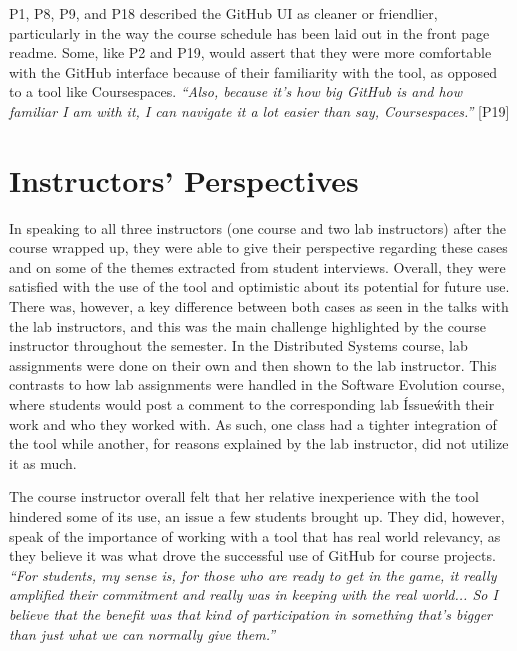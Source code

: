 P1, P8, P9, and P18 described the GitHub UI as cleaner or friendlier, particularly in the way the course schedule has been laid out in the front page readme. Some, like P2 and P19, would assert that they were more comfortable with the GitHub interface because of their familiarity with the tool, as opposed to a tool like Coursespaces. \textit{``Also, because it's how big GitHub is and how familiar I am with it, I can navigate it a lot easier than say, Coursespaces.''} [P19]


\section{Instructors' Perspectives}
In speaking to all three instructors (one course and two lab instructors) after the course wrapped up, they were able to give their perspective regarding these cases and on some of the themes extracted from student interviews. Overall, they were satisfied with the use of the tool and optimistic about its potential for future use. There was, however, a key difference between both cases as seen in the talks with the lab instructors, and this was the main challenge highlighted by the course instructor throughout the semester. In the Distributed Systems course, lab assignments were done on their own and then shown to the lab instructor. This contrasts to how lab assignments were handled in the Software Evolution course, where students would post a comment to the corresponding lab \'Issue\' with their work and who they worked with. As such, one class had a tighter integration of the tool while another, for reasons explained by the lab instructor, did not utilize it as much.

The course instructor overall felt that her relative inexperience with the tool hindered some of its use, an issue a few students brought up. They did, however, speak of the importance of working with a tool that has real world relevancy, as they believe it was what drove the successful use of GitHub for course projects. \textit{``For students, my sense is, for those who are ready to get in the game, it really amplified their commitment and really was in keeping with the real world... So I believe that the benefit was that kind of participation in something that's bigger than just what we can normally give them.''}

